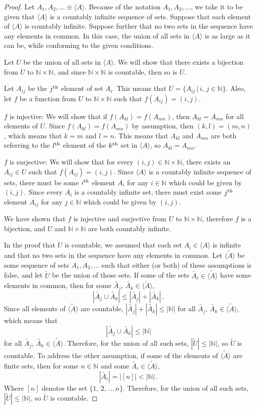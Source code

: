 \documentclass[10pt,letterpaper]{article}
\newcommand{\N}{\mathbb{N}}
\newcommand{\tA}{\tilde{\langle A \rangle}}
\newcommand{\A}{\langle A \rangle}
\newcommand{\ts}{\textsuperscript}
\begin{document}
\begin{proof}
Let $A_1, A_2, \ldots \equiv \A$. Because of the notation $A_1, A_2, \ldots$, we take it to be given that $\A$ is a countably infinite sequence of sets. Suppose that each element of $\A$ is countably infinite. Suppose further that no two sets in the sequence have any elements in common. In this case, the union of all sets in $\A$ is as large as it can be, while conforming to the given conditions. 

Let $U$ be the union of all sets in $\A$. We will show that there exists a bijection from $U$ to $\N \times \N$, and since $\N \times \N$ is countable, then so is $U$.

Let $A_{ij}$ be the $j\ts{th}$ element of set $A_i$. This means that $U = \{A_{ij} \, |\,  i,\, j \in \N\}$. Also, let $f$ be a function from $U$ to $\N \times \N$ such that $f(A_{ij}) = (i,j)$.  

$f$ is injective: We will show that if $f(A_{kl})=f(A_{mn})$, then $A_{kl}=A_{mn}$ for all elements of $U$. Since $f(A_{kl})=f(A_{mn})$ by assumption, then $(k,l)=(m,n)$, which means that $k=m$ and $l=n$. This means that $A_{kl}$ and $A_{mn}$ are both referring to the $l\ts{th}$ element of the $k\ts{th}$ set in $\A$, so $A_{kl}=A_{mn}$.

$f$ is surjective: We will show that for every $(i,j) \in \N \times \N$, there exists an $A_{ij} \in U$ such that $f(A_{ij})=(i,j)$. Since $\A$ is a countably infinite sequence of sets, there must be some $i\ts{th}$ element $A_i$ for any $i \in \N$ which could be given by $(i,j)$.  Since every $A_i$ is a countably infinite set, there must exist some $j\ts{th}$ element $A_{ij}$ for any $j \in \N$ which could be given by $(i,j)$.

We have shown that $f$ is injective and surjective from $U$ to $\N \times \N$, therefore $f$ is a bijection, and $U$ and $\N \times \N$ are both countably infinite. 

In the proof that $U$ is countable, we assumed that each set $A_i \in \A$ is infinite and that no two sets in the sequence have any elements in common. Let $\tA$ be some sequence of sets $A_1, A_2, \ldots$ such that either (or both) of these assumptions is false, and let $\tilde{U}$ be the union of those sets. If some of the sets $\tilde{A_i} \in \tA$ have some elements in common, then for some $\tilde{A_j},\,\tilde{A_k}  \in \tA$, $$|\tilde{A_j} \cup \tilde{A_k}| \leq |\tilde{A_j}| + |\tilde{A_k}|\,.$$ Since all elements of $\tA$ are countable, $|\tilde{A_j}| + |\tilde{A_k}| \leq |\N|$ for all $\tilde{A_j},\,\tilde{A_k}  \in \tA$, which means that $$|\tilde{A_j} \cup \tilde{A_k}| \leq |\N|$$ for all $\tilde{A_j},\,\tilde{A_k}  \in \tA$. Therefore, for the union of all such sets, $|\tilde{U}| \leq |\N|$, so $\tilde{U}$ is countable. To address the other assumption, if some of the elements of $\tA$ are finite sets, then for some $n \in \N$ and some $\tilde{A_i} \in \tA$, $$|\tilde{A_i}| = |[n]| < |\N|\,.$$
Where $[n]$ denotes the set $\{1,\, 2,\, \ldots \, n\}$. Therefore, for the union of all such sets, $|\tilde{U}| \leq |\N|$, so $\tilde{U}$ is countable.
 

\end{proof}
\end{document}
